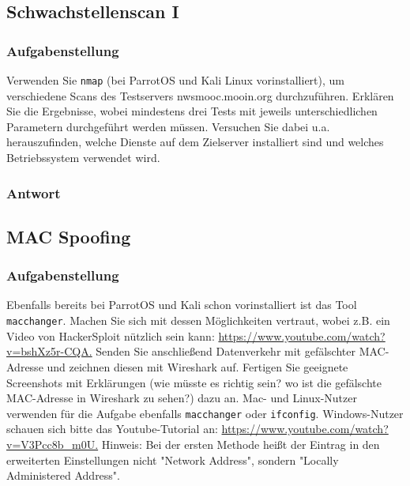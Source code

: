\documentclass{article}
\begin{document}
\newpage

\subsection{Schwachstellenscan I}

\subsubsection*{Aufgabenstellung}

Verwenden Sie \texttt{nmap} (bei ParrotOS und Kali Linux vorinstalliert), um verschiedene 
Scans des Testservers nwsmooc.mooin.org durchzuführen. Erklären Sie die Ergebnisse, wobei 
mindestens drei Tests mit jeweils unterschiedlichen Parametern durchgeführt werden müssen. 
Versuchen Sie dabei u.a. herauszufinden, welche Dienste auf dem Zielserver installiert
sind und welches Betriebssystem verwendet wird.

\subsubsection*{Antwort}

\newpage

\subsection{MAC Spoofing}

\subsubsection*{Aufgabenstellung}

Ebenfalls bereits bei ParrotOS und Kali schon vorinstalliert ist das Tool 
\texttt{macchanger}. Machen Sie sich mit dessen Möglichkeiten vertraut, wobei z.B. ein 
Video von HackerSploit nützlich sein kann: \url{https://www.youtube.com/watch?v=bshXz5r-CQA.}
Senden Sie anschließend Datenverkehr mit gefälschter MAC-Adresse und zeichnen diesen mit 
Wireshark auf. Fertigen Sie geeignete Screenshots mit Erklärungen (wie müsste es richtig 
sein? wo ist die gefälschte MAC-Adresse in Wireshark zu sehen?) dazu an.
Mac- und Linux-Nutzer verwenden für die Aufgabe ebenfalls \texttt{macchanger} oder 
\texttt{ifconfig}. Windows-Nutzer schauen sich bitte das Youtube-Tutorial an:
\url{https://www.youtube.com/watch?v=V3Pcc8b_m0U.}
Hinweis: Bei der ersten Methode heißt der Eintrag in den erweiterten Einstellungen nicht
"Network Address", sondern "Locally Administered Address".
\end{document}
